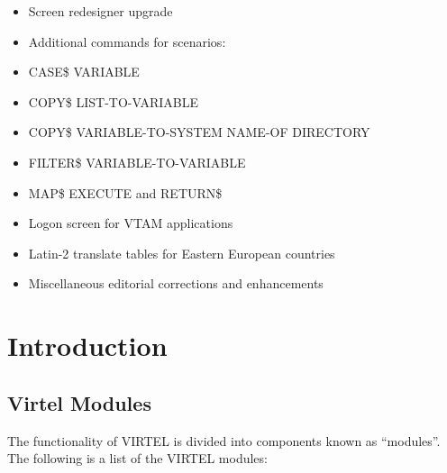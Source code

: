 \documentclass[letterpaper,10pt,english]{sphinxmanual}
\begin{document}
\begin{itemize}
\item {} 
Screen redesigner upgrade

\item {} 
Additional commands for scenarios:

\item {} 
CASE\$ VARIABLE

\item {} 
COPY\$ LIST-TO-VARIABLE

\item {} 
COPY\$ VARIABLE-TO-SYSTEM NAME-OF DIRECTORY

\item {} 
FILTER\$ VARIABLE-TO-VARIABLE

\item {} 
MAP\$ EXECUTE and RETURN\$

\end{itemize}

\begin{itemize}
\item {} 
Logon screen for VTAM applications

\item {} 
Latin-2 translate tables for Eastern European countries

\item {} 
Miscellaneous editorial corrections and enhancements

\end{itemize}


\chapter{Introduction}
\label{\detokenize{Installation_Guide:introduction}}\label{\detokenize{Installation_Guide:vvrrig-introduction}}

\section{Virtel Modules}
\label{\detokenize{Installation_Guide:virtel-modules}}\label{\detokenize{Installation_Guide:index-0}}
The functionality of VIRTEL is divided into components known as “modules”. The following is a list of the VIRTEL modules:

\end{document}

